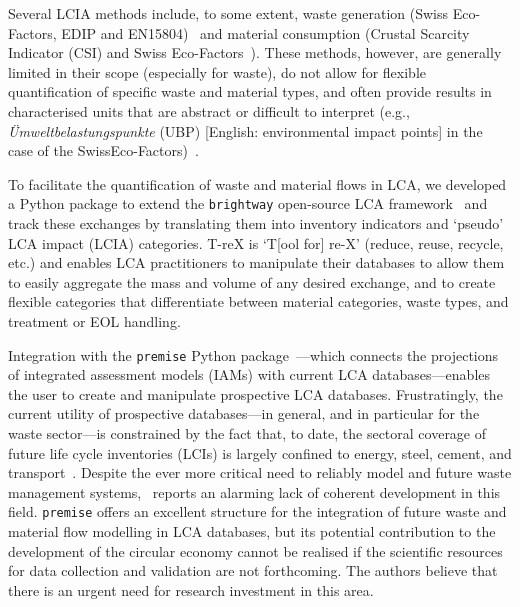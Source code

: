 \documentclass[a4paper,fleqn]{cas-dc}
\begin{document}
	Several LCIA methods include, to some extent, waste generation (Swiss Eco-Factors, EDIP and EN15804)~\citep{foen2021ecofactors,hauschild2003edip,cen2019en15804} and material consumption (Crustal Scarcity Indicator (CSI) and Swiss Eco-Factors~\citep{arvidsson2020csi,foen2021ecofactors}). These methods, however, are generally limited in their scope (especially for waste), do not allow for flexible quantification of specific waste and material types, and often provide results in characterised units that are abstract or difficult to
	interpret (e.g., \textit{Ümweltbelastungspunkte} (UBP) [English: environmental impact points] in the case of the SwissEco-Factors)~\citep{su2020sustainableproddev}.
	
	To facilitate the quantification of waste and material flows in LCA, we
	developed a Python package to extend the \texttt{brightway} open-source LCA
	framework~\citep{mutel2017brightway} and track these exchanges by translating
	them into inventory indicators and `pseudo' LCA impact (LCIA) categories. T-reX
	is `T[ool for] re-X' (reduce, reuse, recycle, etc.) and enables LCA
	practitioners to manipulate their databases to allow them to easily aggregate
	the mass and volume of any desired exchange, and to create flexible categories
	that differentiate between material categories, waste types, and treatment or
	EOL handling.
	
	Integration with the \texttt{premise} Python
	package~\citep{sacchi2022premise}---which connects the projections of
	integrated assessment models (IAMs) with current LCA databases---enables the
	user to create and manipulate prospective LCA databases. Frustratingly, the
	current utility of prospective databases---in general, and in particular for
	the waste sector---is constrained by the fact that, to date, the sectoral
	coverage of future life cycle inventories (LCIs) is largely confined to energy,
	steel, cement, and transport~\citep{sacchi2023premisedocs}. Despite the ever
	more critical need to reliably model and future waste management
	systems,~\cite{bisinella2024wastelca} reports an alarming lack of coherent
	development in this field. \texttt{premise} offers an excellent structure for
	the integration of future waste and material flow modelling in LCA databases,
	but its potential contribution to the development of the circular economy
	cannot be realised if the scientific resources for data collection and
	validation are not forthcoming. The authors believe that there is an urgent
	need for research investment in this area.
	
\end{document}
